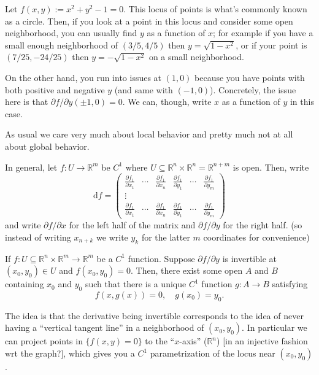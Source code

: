 \documentclass[10pt]{scrartcl}
\providecommand{\RR}{\mathbb R}
\begin{document}
\begin{example}
	Let $f(x,y) := x^2 + y^2 - 1 = 0$.
	This locus of points is what's commonly known as a circle.
	Then, if you look at a point in this locus and consider
	some open neighborhood, you can usually find $y$ as a function of $x$;
	for example if you have a small enough neighborhood of
	$(3/5,4/5)$ then $y = \sqrt{1-x^2}$, or if your point is
	$(7/25,-24/25)$ then $y = -\sqrt{1-x^2}$ on a small neighborhood.
	
	On the other hand, you run into issues at $(1,0)$ because you have
	points with both positive and negative $y$ (and same with $(-1,0)$).
	Concretely, the issue here is that $\partial f/\partial y(\pm1,0) = 0$.
	We can, though, write $x$ as a function of $y$ in this case.
\end{example}

As usual we care very much about local behavior
and pretty much not at all about global behavior.

In general, let $f\colon U\to\RR^m$ be $C^1$
where $U\subseteq \RR^n\times\RR^n =\RR^{n+m}$ is open. Then, write
\[\mathrm df = \begin{pmatrix}
	\frac{\partial f_1}{\partial x_1} &\cdots&
	\frac{\partial f_1}{\partial x_n} & \frac{\partial f_1}{\partial y_1}
	&\cdots&\frac{\partial f_1}{\partial y_m}\\
	\vdots\\
	\frac{\partial f_1}{\partial x_1} &\cdots&
	\frac{\partial f_1}{\partial x_n} & \frac{\partial f_1}{\partial y_1}
	&\cdots&\frac{\partial f_1}{\partial y_m}
\end{pmatrix}\]
and write $\partial f/\partial x$ for the left half of the matrix
and $\partial f/\partial y$ for the right half.
(so instead of writing $x_{n+k}$ we write $y_k$ for the latter $m$
coordinates for convenience)
\begin{theorem}
	If $f\colon U\subseteq\RR^n\times\RR^m\to\RR^m$ be a $C^1$ function.
	Suppose $\partial f/\partial y$ is invertible at $(x_0,y_0)\in U$
	and $f(x_0, y_0) = 0$.
	Then, there exist some open $A$ and $B$ containing $x_0$ and $y_0$
	such that there is a unique $C^1$ function $g\colon A\to B$ satisfying
	\[f(x,g(x)) = 0,\quad g(x_0) = y_0.\]
\end{theorem}

The idea is that the derivative being invertible
corresponds to the idea of never having a ``vertical tangent line''
in a neighborhood of $(x_0,y_0)$. In particular we can
project points in $\{f(x,y) = 0\}$ to the ``$x$-axis'' ($\RR^n$)
[in an injective fashion wrt the graph?], which gives you
a $C^1$ parametrization of the locus near $(x_0,y_0)$.
\end{document}
